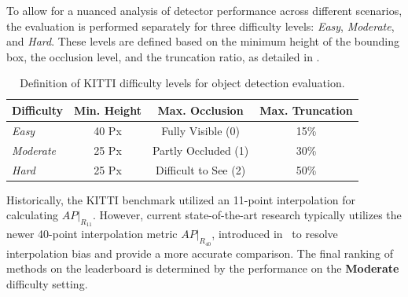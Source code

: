 To allow for a nuanced analysis of detector performance across different scenarios, the evaluation is performed separately for three difficulty levels: \textit{Easy}, \textit{Moderate}, and \textit{Hard}. These levels are defined based on the minimum height of the bounding box, the occlusion level, and the truncation ratio, as detailed in .

\begin{table}[h]
    \centering
    \caption{Definition of KITTI difficulty levels for object detection evaluation.}
    \label{tab:kitti_difficulty}
    \begin{tabular}{l|ccc}
        \hline
        \textbf{Difficulty} & \textbf{Min. Height} & \textbf{Max. Occlusion} & \textbf{Max. Truncation} \\
        \hline
        \textit{Easy} & 40 Px & Fully Visible (0) & 15\% \\
        \textit{Moderate} & 25 Px & Partly Occluded (1) & 30\% \\
        \textit{Hard} & 25 Px & Difficult to See (2) & 50\% \\
        \hline
    \end{tabular}
\end{table}

Historically, the KITTI benchmark utilized an 11-point interpolation for calculating $AP|_{R_{11}}$. However, current state-of-the-art research typically utilizes the newer 40-point interpolation metric $AP|_{R_{40}}$, introduced in~\cite{MonoDis} to resolve interpolation bias and provide a more accurate comparison. The final ranking of methods on the leaderboard is determined by the performance on the \textbf{Moderate} difficulty setting.